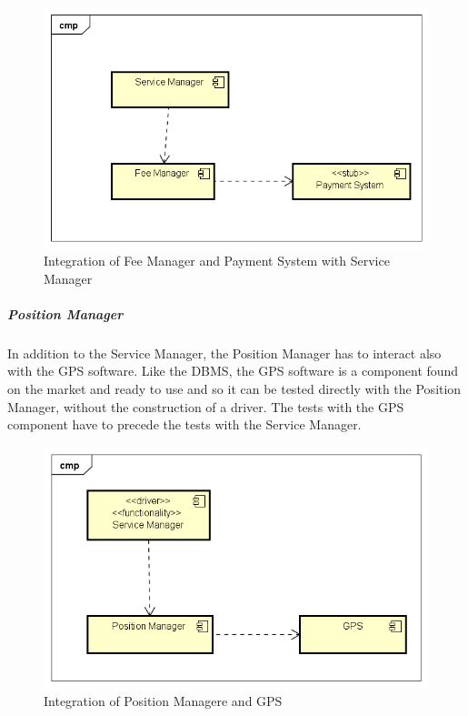 \begin{figure}[H]	
	\centering
	\includegraphics[width=\textwidth]{img/FeeMan_SrvMan_int}
	\caption{Integration of Fee Manager and Payment System with Service Manager}
\end{figure}

\subparagraph{Position Manager}
In addition to the Service Manager, the Position Manager has to interact also with the GPS software. Like the DBMS, the GPS software is a component found on the market and ready to use and so it can be tested directly with the Position Manager, without the construction of a driver. The tests with the GPS component have to precede the tests with the Service Manager.


\begin{figure}[H]	
	\centering
	\includegraphics[width=\textwidth]{img/PosMan_SrvMan_int}
	\caption{Integration of Position Managere and GPS}
\end{figure}


